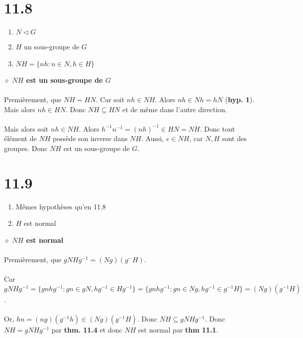 \documentclass[a4paper,10pt]{article}
\begin{document}
\section*{11.8}
\begin{enumerate}
	\item $N \triangleleft G$
	\item $H$ un sous-groupe de $G$
	\item $NH = \{nh : n \in N, h \in H\}$
\end{enumerate}
$\diamond$ \textbf{$NH$ est un sous-groupe de $G$}
\\
\\
Premièrement, que $NH = HN$. Car soit $nh \in NH$. Alors $nh \in Nh = hN$ (\textbf{hyp. 1}). Mais alors $nh \in HN$. Donc $NH \subseteq HN$ et de même dans l'autre direction.
\\
\\
Mais alors soit $nh \in NH$. Alors $h^{-1}n^{-1} = (nh)^{-1} \in HN = NH$. Donc tout élément de $NH$ possède son inverse dans $NH$. Aussi, $e \in NH$, car $N,H$ sont des groupes. Donc $NH$ est un sous-groupe de $G$. 

\section*{11.9}
\begin{enumerate}
	\item Mêmes hypothèses qu'en 11.8
	\item $H$ est normal
\end{enumerate}
$\diamond$ \textbf{$NH$ est normal}
\\
\\
Premièrement, que $gNHg^{-1} = (Ng)(g^{-}H)$. 
\\
\\
Car $gNHg^{-1} = \{gnhg^{-1} : gn \in gN, hg^{-1} \in Hg^{-1}\} =
 \{gnhg^{-1} : gn \in Ng, hg^{-1} \in g^{-1}H\} = (Ng)(g^{-1}H)$.
\\
\\
Or, $hn = (ng)(g^{-1}h) \in (Ng)(g^{-1}H)$. Donc $NH \subseteq gNHg^{-1}$. Donc $NH = gNHg^{-1}$ par \textbf{thm. 11.4} et donc $NH$ est normal par \textbf{thm 11.1}.
\end{document}
